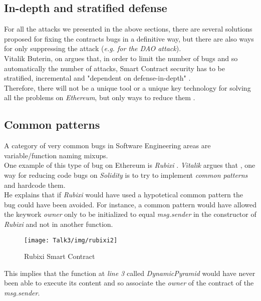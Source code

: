 \subsection{In-depth and stratified defense}
For all the attacks we presented in the above sections, there are several solutions proposed for fixing the contracts bugs in a definitive way, but there are also ways for only suppressing the attack (\textit{e.g. for the DAO attack}). \\
Vitalik Buterin, on \cite{challenge2} argues that, in order to limit the number of bugs and so automatically the number of attacks, Smart Contract security has to be stratified, incremental and "dependent on defense-in-depth" \cite{challenge2}. \\
Therefore, there will not be a unique tool or a unique key technology for solving all the problems on \textit{Ethereum}, but only ways to reduce them \cite{challenge2}.
\subsection{Common patterns}
A category of very common bugs in Software Engineering areas are variable/function naming mixups. \\
One example of this type of bug on Ethereum is \textit{Rubixi} \cite{rubixi1}. \textit{Vitalik} argues that \cite{challenge2}, one way for reducing code bugs on \textit{Solidity} is to try to implement \textit{common patterns} and hardcode them. \\
He explains that if \textit{Rubixi} would have used a hypotetical common pattern the bug could have been avoided. 
For instance, a common pattern would have allowed the keywork \textit{owner} only to be initialized to equal \textit{msg.sender} in the constructor of \textit{Rubixi} and not in another function. 
\begin{figure}[H]
\begin{center}
\texttt{[image: Talk3/img/rubixi2]}
\end{center}
\caption{Rubixi Smart Contract}
\label{label}
\end{figure}

This implies that the function at \textit{line 3} called \textit{DynamicPyramid} would have never been able to execute its content and so associate the \textit{owner} of the contract of the \textit{msg.sender}.

